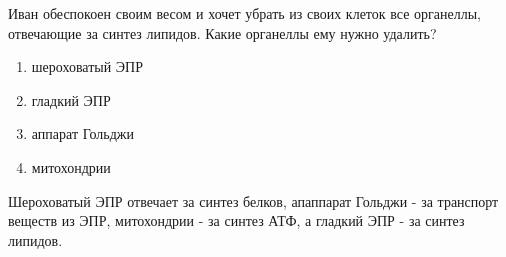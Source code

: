 
Иван обеспокоен своим весом и хочет убрать из
своих клеток все органеллы, отвечающие за синтез липидов. Какие органеллы ему
нужно удалить? 

\begin{enumerate}
    \item шероховатый ЭПР
    \item гладкий ЭПР
    \item аппарат Гольджи 
    \item митохондрии
\end{enumerate}

\explanationSection

Шероховатый ЭПР отвечает за синтез белков, апаппарат Гольджи - за транспорт веществ из ЭПР,  митохондрии - за синтез АТФ, а гладкий ЭПР - за синтез липидов. 

